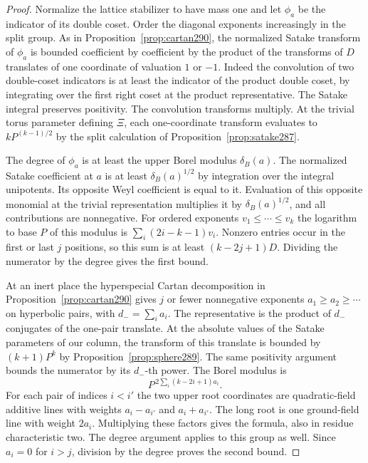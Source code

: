 \documentclass[a4paper,11pt]{article}
\theoremstyle{definition}
\theoremstyle{remark}
\numberwithin{equation}{section}
\begin{document}
\begin{proof}
Normalize the lattice stabilizer to have mass one and let
\(\phi_a\) be the indicator of its double coset. Order the
diagonal exponents increasingly in the split group. As in
Proposition~\ref{prop:cartan290}, the normalized Satake transform
of \(\phi_a\) is bounded coefficient by coefficient by the
product of the transforms of \(D\) translates of one coordinate
of valuation \(1\) or \(-1\). Indeed the convolution of two
double-coset indicators is at least the indicator of the
product double coset, by integrating over the first right
coset at the product representative. The Satake integral
preserves positivity. The convolution transforms multiply.
At the trivial torus parameter defining \(\Xi\), each
one-coordinate transform evaluates to \(kP^{(k-1)/2}\)
by the split calculation of Proposition~\ref{prop:satake287}.

The degree of \(\phi_a\) is at least the upper Borel modulus
\(\delta_B(a)\). The normalized Satake coefficient at \(a\)
is at least \(\delta_B(a)^{1/2}\) by integration over the
integral unipotents. Its opposite Weyl coefficient is equal
to it. Evaluation of this opposite monomial at the trivial
representation multiplies it by \(\delta_B(a)^{1/2}\),
and all contributions are nonnegative. For ordered exponents
\(v_1\le\cdots\le v_k\) the logarithm to base \(P\) of this
modulus is \(\sum_i(2i-k-1)v_i\). Nonzero entries occur in
the first or last \(j\) positions, so this sum is at least
\((k-2j+1)D\). Dividing the numerator by the degree gives
the first bound.

At an inert place the hyperspecial Cartan decomposition in
Proposition~\ref{prop:cartan290} gives \(j\) or fewer
nonnegative exponents \(a_1\ge a_2\ge\cdots\) on hyperbolic
pairs, with \(d_-=\sum_i a_i\). The representative is the
product of \(d_-\) conjugates of the one-pair translate.
At the absolute values of the Satake parameters of our
column, the transform of this translate is bounded by
\((k+1)P^k\) by Proposition~\ref{prop:sphere289}. The same
positivity argument bounds the numerator by its \(d_-\)-th
power. The Borel modulus is
\[
                  P^{\,2\sum_i (k-2i+1)a_i}.
\]
For each pair of indices \(i<i'\) the two upper root
coordinates are quadratic-field additive lines with weights
\(a_i-a_{i'}\) and \(a_i+a_{i'}\). The long root is one
ground-field line with weight \(2a_i\). Multiplying these
factors gives the formula, also in residue characteristic
two. The degree argument applies to this group as well.
Since \(a_i=0\) for \(i>j\), division by the degree proves
the second bound.
\end{proof}
\end{document}
